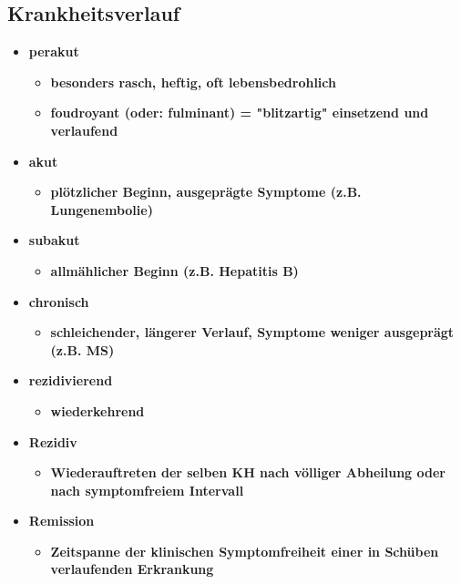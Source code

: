 \subsection{Krankheitsverlauf}
	\begin{itemize}
		\item \textbf{perakut}
			\begin{itemize}
				\item \textbf{besonders rasch, heftig, oft lebensbedrohlich}
				\item \textbf{foudroyant (oder: fulminant) = "blitzartig" einsetzend und verlaufend}
			\end{itemize}
		\item \textbf{akut}
			\begin{itemize}
				\item \textbf{plötzlicher Beginn, ausgeprägte Symptome (z.B. Lungenembolie)}
			\end{itemize}
		\item \textbf{subakut}
			\begin{itemize}
				\item \textbf{allmählicher Beginn (z.B. Hepatitis B)}
			\end{itemize}
		\item \textbf{chronisch}
			\begin{itemize}
				\item \textbf{schleichender, längerer Verlauf, Symptome weniger ausgeprägt (z.B. MS)}
			\end{itemize}
		\item \textbf{rezidivierend}
			\begin{itemize}
				\item \textbf{wiederkehrend}
			\end{itemize}
		\item \textbf{Rezidiv}
			\begin{itemize}
				\item \textbf{Wiederauftreten der selben KH nach völliger Abheilung oder nach symptomfreiem Intervall}
			\end{itemize}
		\item \textbf{Remission}
			\begin{itemize}
				\item \textbf{Zeitspanne der klinischen Symptomfreiheit einer in Schüben verlaufenden Erkrankung}
			\end{itemize}
	\end{itemize}

